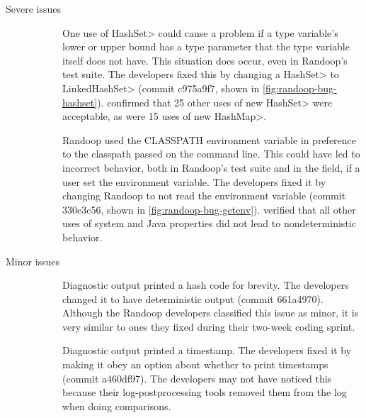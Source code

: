 \begin{description}
\item[Severe issues]
  \strut
\begin{description}
\item[\bugHashSet]
One use of \<HashSet> could cause a problem if a type variable's lower or upper
bound has a type parameter that the type variable itself does not have.
This situation does occur, even in Randoop's test suite.
The developers fixed this by changing a \<HashSet> to \<LinkedHashSet>
(commit c975a9f7, shown in \cref{fig:randoop-bug-hashset}).
\TheDeterminismChecker confirmed that 
25 other uses of \<new HashSet> were acceptable, as were 15 uses of \<new HashMap>.

\item[\bugClasspath]
Randoop used the CLASSPATH environment variable in preference to the
classpath passed on the command line.
This could have led to incorrect behavior, both in Randoop's test suite and in the field,
if a user set the environment variable.
The developers fixed it by changing Randoop to not read the environment variable
(commit 330e3c56, shown in \cref{fig:randoop-bug-getenv}).
\TheDeterminismChecker verified that all other uses of system and Java
properties did not lead to nondeterministic behavior.
\end{description}

\item[Minor issues]
\strut
\begin{description}
 
\item[\bugHashcodeOutput]
  Diagnostic output printed a hash code for brevity.
  The developers changed it to have deterministic output (commit 661a4970).
  Although the Randoop developers classified this issue as minor, it is
  very similar to ones they fixed during their two-week coding sprint.

\item[\bugTimestampOutput]
  Diagnostic output printed a timestamp.
  The developers fixed it by making it obey an
  option about whether to print timestamps (commit a460df97).
  The developers may not have noticed this because their log-postprocessing
  tools removed them from the log when doing comparisons.

\end{description}

\end{description}

